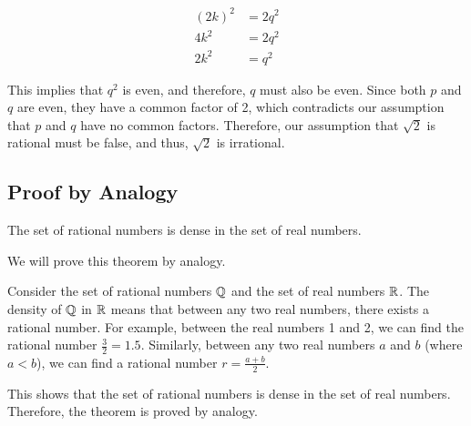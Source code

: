 \begin{align*}
{(2k)}^2 &= 2q^2\\	
4k^2 &= 2q^2\\
2k^2 &= q^2
\end{align*}

This implies that \( q^2 \) is even, and therefore, \(q\) must also be even.
Since both \(p\) and \(q\) are even, they have a common factor of 2, which contradicts our 
assumption that \(p\) and \(q\) have no common factors. Therefore, our assumption that 
\( \sqrt{2} \) is rational must be false, and thus, \( \sqrt{2} \) is irrational.

\QED

\subsection{Proof by Analogy}

The set of rational numbers is dense in the set of real numbers.

We will prove this theorem by analogy.
\vspace{\baselineskip}
	
Consider the set of rational numbers \( \mathbb{Q} \) and the set of real numbers \( \mathbb{R} \). 
The density of \( \mathbb{Q} \) in \( \mathbb{R} \) means that between any two real numbers, there exists a 
rational number. For example, between the real numbers 1 and 2, we can find the rational 
number \( \frac{3}{2} = 1.5 \). Similarly, between any two real numbers \(a\) and \(b\) (where 
\( a < b \)), we can find a rational number \( r = \frac{a + b}{2} \).
\vspace{\baselineskip}

This shows that the set of rational numbers is dense in the set of real numbers.
Therefore, the theorem is proved by analogy.

\QED


